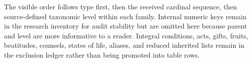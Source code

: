 \begin{landscape}
The visible order follows type first, then the received cardinal sequence, then source-defined taxonomic level within each family. Internal numeric keys remain in the research inventory for audit stability but are omitted here because parent and level are more informative to a reader. Integral conditions, acts, gifts, fruits, beatitudes, counsels, states of life, aliases, and reduced inherited lists remain in the exclusion ledger rather than being promoted into table rows.

\end{landscape}
